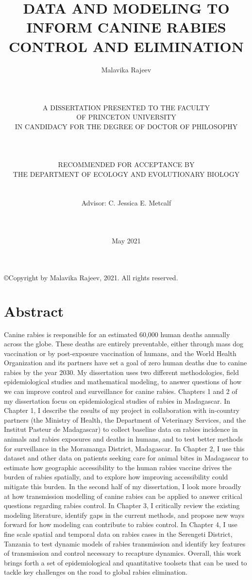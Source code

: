 \documentclass[
  oneside]{book}
\title{DATA AND MODELING TO INFORM CANINE RABIES CONTROL AND ELIMINATION\\}
\author{}
\date{\vspace{-2.5em}Malavika Rajeev\\
~\\
~\\
~\\
A DISSERTATION PRESENTED TO THE FACULTY\\
OF PRINCETON UNIVERSITY\\
IN CANDIDACY FOR THE DEGREE OF DOCTOR OF PHILOSOPHY\\
~\\
~\\
~\\
RECOMMENDED FOR ACCEPTANCE BY\\
THE DEPARTMENT OF ECOLOGY AND EVOLUTIONARY BIOLOGY\\
~\\
~\\
Advisor: C. Jessica E. Metcalf\\
~\\
~\\
~\\
May 2021\\}
\begin{document}
\maketitle


\begin{center}

\copyright  Copyright by Malavika Rajeev, 2021. All rights reserved.

\end{center}

\frontmatter

\setcounter{page}{3}  %

\section*{Abstract}

Canine rabies is responsible for an estimated 60,000 human deaths annually across the globe. These deaths are entirely preventable, either through mass dog vaccination or by post-exposure vaccination of humans, and the World Health Organization and its partners have set a goal of zero human deaths due to canine rabies by the year 2030. My dissertation uses two different methodologies, field epidemiological studies and mathematical modeling, to answer questions of how we can improve control and surveillance for canine rabies. Chapters 1 and 2 of my dissertation focus on epidemiological studies of rabies in Madagascar. In Chapter 1, I describe the results of my project in collaboration with in-country partners (the Ministry of Health, the Department of Veterinary Services, and the Institut Pasteur de Madagascar) to collect baseline data on rabies incidence in animals and rabies exposures and deaths in humans, and to test better methods for surveillance in the Moramanga District, Madagascar. In Chapter 2, I use this dataset and other data on patients seeking care for animal bites in Madagascar to estimate how geographic accessibility to the human rabies vaccine drives the burden of rabies spatially, and to explore how improving accessibility could mitigate this burden. In the second half of my dissertation, I look more broadly at how transmission modelling of canine rabies can be applied to answer critical questions regarding rabies control. In Chapter 3, I critically review the existing modeling literature, identify gaps in the current methods, and propose new ways forward for how modeling can contribute to rabies control. In Chapter 4, I use fine scale spatial and temporal data on rabies cases in the Serengeti District, Tanzania to test dynamic models of rabies transmission and identify key features of transmission and control necessary to recapture dynamics. Overall, this work brings forth a set of epidemiological and quantitative toolsets that can be used to tackle key challenges on the road to global rabies elimination. 
\end{document}

